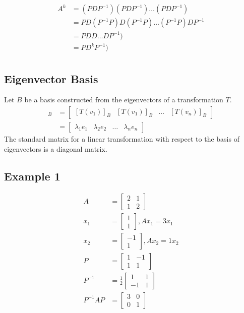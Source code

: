 \documentclass{article}
\theoremstyle{mytheoremstyle}
\theoremstyle{mytheoremstyle}
\theoremstyle{myproblemstyle}
\begin{document}
    \begin{align*}
        A^k &= (PDP^{-1})(PDP^{-1})\dots(PDP^{-1}) \\
            &= PD(P^{-1}P)D(P^{-1}P)\dots(P^{-1}P)DP^{-1} \\
            &= PDD\dots DP^{-1}) \\
            &= PD^kP^{-1}) \\
    \end{align*}

    \subsection*{Eigenvector Basis}
    Let $B$ be a basis constructed from the eigenvectors of a transformation
    $T$.
    \begin{align*}
        [T]_B &= \begin{bmatrix}
            [T(v_1)]_B & [T(v_1)]_B & \dots & [T(v_n)]_B
        \end{bmatrix} \\
        &= \begin{bmatrix}
            \lambda_1 e_1 & \lambda_2 e_2 & \dots & \lambda_n e_n
        \end{bmatrix}
    \end{align*}
    The standard matrix for a linear transformation with respect to the basis of
    eigenvectors is a diagonal matrix.

    \subsection*{Example 1}
    \begin{align*}
        A &= \begin{bmatrix}
            2 & 1 \\
            1 & 2
        \end{bmatrix} \\
        x_{1} &= \begin{bmatrix}
            1 \\ 1
        \end{bmatrix}, Ax_1 = 3x_1 \\
        x_{2} &= \begin{bmatrix}
            -1 \\ 1
        \end{bmatrix}, Ax_2 = 1x_2 \\
        P &= \begin{bmatrix}
            1 & -1 \\
            1 & 1
        \end{bmatrix} \\
        P^{-1} &= \frac{1}{2} \begin{bmatrix}
            1 & 1 \\
            -1 & 1
        \end{bmatrix} \\
        P^{-1}AP &= \begin{bmatrix}
            3 & 0 \\
            0 & 1
        \end{bmatrix}
    \end{align*}
\end{document}
